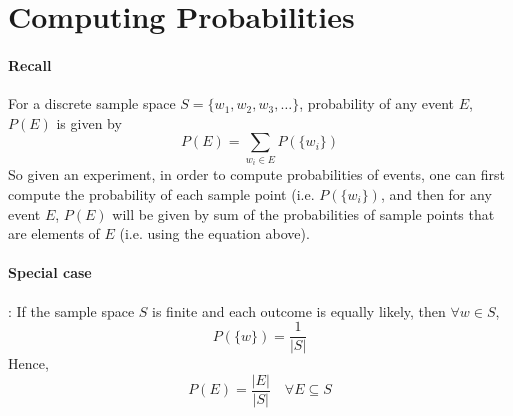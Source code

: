 \section{Computing Probabilities}
\paragraph{Recall}
For a discrete sample space $S = \lbrace w_1, w_2, w_3, \dots \rbrace$,
probability of any event $E$, $P(E)$ is given by 
\begin{equation*}
    P(E) = \sum_{w_i \in E} P(\lbrace w_i \rbrace)
\end{equation*}
So given an experiment, in order to compute probabilities of events, one can
first compute the probability of each sample point (i.e. $P(\lbrace w_i
\rbrace)$, and then for any event $E$, $P(E)$ will be given by sum of the
probabilities of sample points that are elements of $E$ (i.e. using the
equation above).

\paragraph{Special case}: If the sample space $S$ is finite and each outcome is
equally likely, then $\forall w \in S$, 
\begin{equation*}
    P(\lbrace w \rbrace) = \frac{1}{\vert S \vert}
\end{equation*}
Hence, 
\begin{equation*}
    P(E) = \frac{\vert E \vert}{\vert S \vert} \quad \forall E \subseteq S
\end{equation*}

